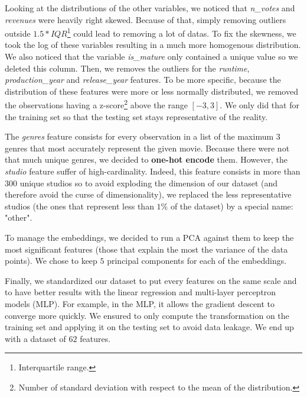 Looking at the distributions of the other variables, we noticed that \textit{n\_votes} and \textit{revenues} were heavily right skewed. Because of that, simply removing outliers outside $1.5 * IQR$\footnote{Interquartile range.} could lead to removing a lot of datas. To fix the skewness, we took the log of these variables resulting in a much more homogenous distribution. We also noticed that the variable \textit{is\_mature} only contained a unique value so we deleted this column. Then, we removes the outliers for the \textit{runtime}, \textit{production\_year} and \textit{release\_year} features. To be more specific, because the distribution of these features were more or less normally distributed, we removed the observations having a z-score\footnote{Number of standard deviation with respect to the mean of the distribution.} above the range $[-3, 3]$. We only did that for the training set so that the testing set stays representative of the reality. 

The \textit{genres} feature consists for every observation in a list of the maximum $3$ genres that most accurately represent the given movie. Because there were not that much unique genres, we decided to \textbf{one-hot encode} them. However, the \textit{studio} feature suffer of high-cardinality. Indeed, this feature consists in more than $300$ unique studios so to avoid exploding the dimension of our dataset (and therefore avoid the curse of dimensionality), we replaced the less representative studios (the ones that represent less than $1\%$ of the dataset) by a special name: "other". 

To manage the embeddings, we decided to run a PCA against them to keep the most significant features (those that explain the most the variance of the data points). We chose to keep $5$ principal components for each of the embeddings.

Finally, we standardized our dataset to put every features on the same scale and to have better results with the linear regression and multi-layer perceptron models (MLP). For example, in the MLP, it allows the gradient descent to converge more quickly. We ensured to only compute the transformation on the training set and applying it on the testing set to avoid data leakage.
We end up with a dataset of $62$ features.